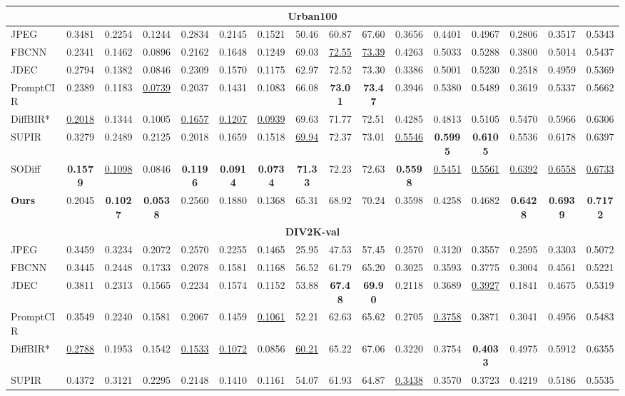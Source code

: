 \documentclass[conference,letterpaper]{IEEEtran}
\newcommand{\best}[1]{\textbf{#1}}
\newcommand{\second}[1]{\underline{#1}}
\begin{document}
\begin{strip}
\begin{minipage}{\textwidth}
\begin{tabular*}{\textwidth}{@{\extracolsep{\fill}}l|ccc|ccc|ccc|ccc|ccc@{}}
\multicolumn{16}{c}{\textbf{Urban100}}\\
\midrule
JPEG & 0.3481&0.2254&0.1244&0.2834&0.2145&0.1521&50.46&60.87&67.60&0.3656&0.4401&0.4967&0.2806&0.3517&0.5343\\
FBCNN & 0.2341&0.1462&0.0896&0.2162&0.1648&0.1249&69.03&\second{72.55}&\second{73.39}&0.4263&0.5033&0.5288&0.3800&0.5014&0.5437\\
JDEC & 0.2794&0.1382&0.0846&0.2309&0.1570&0.1175&62.97&72.52&73.30&0.3386&0.5001&0.5230&0.2518&0.4959&0.5369\\
PromptCIR & 0.2389&0.1183&\second{0.0739}&0.2037&0.1431&0.1083&66.08&\best{73.01}&\best{73.47}&0.3946&0.5380&0.5489&0.3619&0.5337&0.5662\\
DiffBIR* & \second{0.2018}&0.1344&0.1005&\second{0.1657}&\second{0.1207}&\second{0.0939}&69.63&71.77&72.51&0.4285&0.4813&0.5105&0.5470&0.5966&0.6306\\
SUPIR & 0.3279&0.2489&0.2125&0.2018&0.1659&0.1518&\second{69.94}&72.37&73.01&\second{0.5546}&\best{0.5995}&\best{0.6105}&0.5536&0.6178&0.6397\\
SODiff & \best{0.1579}&\second{0.1098}&0.0846&\best{0.1196}&\best{0.0914}&\best{0.0734}&\best{71.33}&72.23&72.63&\best{0.5598}&\second{0.5451}&\second{0.5561}&\second{0.6392}&\second{0.6558}&\second{0.6733}\\
\textbf{Ours} & 0.2045&\best{0.1027}&\best{0.0538}&0.2560&0.1880&0.1368&65.31&68.92&70.24&0.3598&0.4258&0.4682&\best{0.6428}&\best{0.6939}&\best{0.7172}\\
\midrule
\multicolumn{16}{c}{\textbf{DIV2K-val}}\\
\midrule
JPEG & 0.3459&0.3234&0.2072&0.2570&0.2255&0.1465&25.95&47.53&57.45&0.2570&0.3120&0.3557&0.2595&0.3303&0.5072\\
FBCNN & 0.3445&0.2448&0.1733&0.2078&0.1581&0.1168&56.52&61.79&65.20&0.3025&0.3593&0.3775&0.3004&0.4561&0.5221\\
JDEC & 0.3811&0.2313&0.1565&0.2234&0.1574&0.1152&53.88&\best{67.48}&\best{69.90}&0.2118&0.3689&\second{0.3927}&0.1841&0.4675&0.5319\\
PromptCIR & 0.3549&0.2240&0.1581&0.2067&0.1459&\second{0.1061}&52.21&62.63&65.62&0.2705&\second{0.3758}&0.3871&0.3041&0.4956&0.5483\\
DiffBIR* & \second{0.2788}&0.1953&0.1542&\second{0.1533}&\second{0.1072}&0.0856&\second{60.21}&65.22&67.06&0.3220&0.3754&\best{0.4033}&0.4975&0.5912&0.6355\\
SUPIR & 0.4372&0.3121&0.2295&0.2148&0.1410&0.1161&54.07&61.93&64.87&\second{0.3438}&0.3570&0.3723&0.4219&0.5186&0.5535\\

\end{tabular*}
\end{minipage}
\end{strip}
\end{document}
